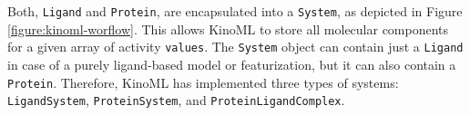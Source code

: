 \documentclass[9pt,lessons]{livecoms}
\begin{document}
Both, \texttt{Ligand} and \texttt{Protein},  are encapsulated into a \texttt{System}, as depicted in Figure \ref{figure:kinoml-worflow}. This allows KinoML to store all molecular components for a given array of activity \texttt{values}. The \texttt{System} object can contain just a \texttt{Ligand} in case of a purely ligand-based model or featurization, but it can also contain a \texttt{Protein}. Therefore, KinoML has implemented three types of systems: \texttt{LigandSystem}, \texttt{ProteinSystem}, and \texttt{ProteinLigandComplex}.



	

    


	

\end{document}
